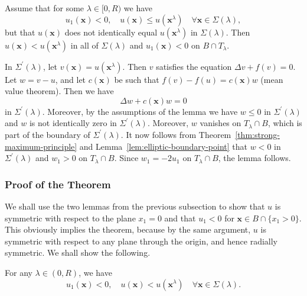 \begin{Lemma}
\label{lem:radial-reflection-strictness}
Assume that for some $\lambda\in[0,R)$ we have
\begin{equation}\label{eq:radial-reflection-weak-comparison}
u_1(\bm{x})<0,\quad u(\bm{x})\leq u(\bm{x}^\lambda)\quad\forall\bm{x}\in\Sigma(\lambda),
\end{equation}
but that $u(\bm{x})$ does not identically equal $u(\bm{x}^\lambda)$ in $\Sigma(\lambda)$. Then $u(\bm{x})<u(\bm{x}^\lambda)$ in all of $\Sigma(\lambda)$ and $u_1(\bm{x})<0$ on $B\cap T_\lambda$.
\end{Lemma}

\begin{Proof}
In $\Sigma^{\prime}(\lambda)$, let $v(\bm{x})=u(\bm{x}^\lambda)$. Then $v$ satisfies the equation $\Delta v+f(v)=0$. Let $w=v-u$, and let $c(\bm{x})$ be such that $f(v)-f(u)=c(\bm{x})w$ (mean value theorem). Then we have
\begin{equation}\label{eq:radial-reflection-difference-equation}
\Delta w+c(\bm{x})w=0
\end{equation}
in $\Sigma^{\prime}(\lambda)$. Moreover, by the assumptions of the lemma we have $w\leq0$ in $\Sigma^{\prime}(\lambda)$ and $w$ is not identically zero in $\Sigma^{\prime}(\lambda)$. Moreover, $w$ vanishes on $T_\lambda\cap B$, which is part of the boundary of $\Sigma^{\prime}(\lambda)$. It now follows from Theorem~\ref{thm:strong-maximum-principle} and Lemma~\ref{lem:elliptic-boundary-point} that $w<0$ in $\Sigma^{\prime}(\lambda)$ and $w_1>0$ on $T_\lambda\cap B$. Since $w_1=-2u_1$ on $T_\lambda\cap B$, the lemma follows.
\end{Proof}

\subsubsection{Proof of the Theorem}\label{subsec:radial-symmetry-theorem-proof}

We shall use the two lemmas from the previous subsection to show that $u$ is symmetric with respect to the plane $x_1=0$ and that $u_1<0$ for $\bm{x}\in B\cap\{x_1>0\}$. This obviously implies the theorem, because by the same argument, $u$ is symmetric with respect to any plane through the origin, and hence radially symmetric. We shall show the following.

\begin{Lemma}
\label{lem:moving-plane-comparison}
For any $\lambda\in(0,R)$, we have
\begin{equation}\label{eq:moving-plane-strict-comparison}
u_1(\bm{x})<0,\quad u(\bm{x})<u(\bm{x}^\lambda)\quad\forall\bm{x}\in\Sigma(\lambda).
\end{equation}

\end{Lemma}


